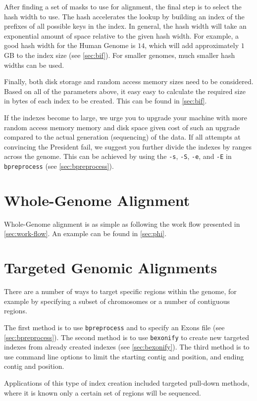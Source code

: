 \documentclass[a4paper,12pt]{book}
\newcommand{\TT}[1]{{\tt #1}} %
\begin{document}
After finding a set of masks to use for alignment, the final step is to select the hash width to use. 
The hash accelerates the lookup by building an index of the prefixes of all possible keys in the index.
In general, the hash width will take an exponential amount of space relative to the given hash width.
For example, a good hash width for the Human Genome is $14$, which will add approximately $1$GB to the index size (see \autoref{sec:bif}).
For smaller genomes, much smaller hash widths can be used.

Finally, both disk storage and random access memory sizes need to be considered.  
Based on all of the parameters above, it easy easy to calculate the required size in bytes of each index to be created.
This can be found in \autoref{sec:bif}.

If the indexes become to large, we urge you to upgrade your machine with more random access memory memory and disk space given cost of such an upgrade compared to the actual generation (sequencing) of the data.
If all attempts at convincing the President fail, we suggest you further divide the indexes by ranges across the genome.
This can be achieved by using the \TT{-s}, \TT{-S}, \TT{-e}, and \TT{-E} in \TT{bpreprocess} (see \autoref{sec:bpreprocess}).

\section{Whole-Genome Alignment}
\label{sec:whole-genome-alignment}
Whole-Genome alignment is as simple as following the work flow presented in \autoref{sec:work-flow}.
An example can be found in \autoref{sec:phi}.
\section{Targeted Genomic Alignments}
\label{sec:targeted-genomic-alignments}
There are a number of ways to target specific regions within the genome, for example by specifying a subset of chromosomes or a number of contiguous regions.

The first method is to use \TT{bpreprocess} and to specify an Exons file (see \autoref{sec:bpreprocess}).
The second method is to use \TT{bexonify} to create new targeted indexes from already created indexes (see \autoref{sec:bexonify}).
The third method is to use command line options to limit the starting contig and position, and ending contig and position.

Applications of this type of index creation included targeted pull-down methods, where it is known only a certain set of regions will be sequenced.
\end{document}
